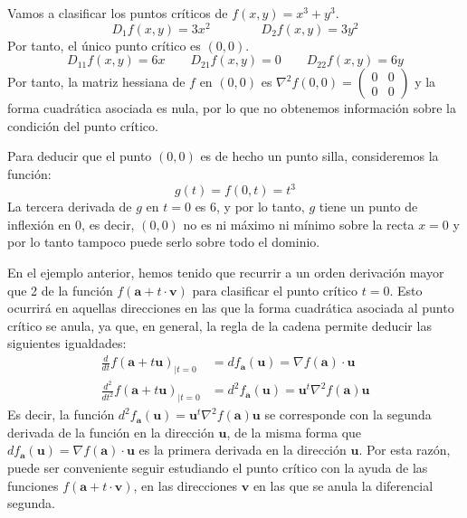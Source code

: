 \begin{ejemplo}
Vamos a clasificar los puntos críticos de $f(x,y)=x^3+y^3$.
\[
D_1f(x,y)=3x^2\qquad\qquad D_2f(x,y)=3y^2
\]
Por tanto, el único punto crítico es $(0,0)$.
\[
D_{11}f(x,y)=6x\qquad D_{21}f(x,y)=0\qquad D_{22}f(x,y)=6y
\]
Por tanto, la matriz hessiana de $f$ en $(0,0)$ es $\nabla^2f(0,0)=\left(\begin{array}{cc}0&0\\
0&0\end{array}\right)$ y la forma cuadrática asociada es nula, por lo que no obtenemos información sobre la condición del punto crítico.

Para deducir que el punto $(0,0)$ es de hecho un punto silla, consideremos la función:
\[
g(t)=f(0,t)=t^3
\]
La tercera derivada de $g$ en $t=0$ es $6$, y por lo tanto, $g$ tiene un punto de inflexión en $0$, es decir, $(0,0)$ no es ni máximo ni mínimo sobre la recta $x=0$ y por lo tanto tampoco puede serlo sobre todo el dominio.\fej
\end{ejemplo}

En el ejemplo anterior, hemos tenido que recurrir a un orden derivación mayor que 2 de la función
$f(\boldsymbol a+t\cdot\boldsymbol v)$ para clasificar el punto crítico $t=0$.
Esto ocurrirá en aquellas direcciones en las que la forma cuadrática asociada al punto crítico se anula, ya que, en general, la regla de la cadena permite deducir las siguientes igualdades:
\begin{align*}
\frac{d}{dt}f(\boldsymbol a+t\boldsymbol u)_{|t=0} & = df_{\boldsymbol a}(\boldsymbol u)=\nabla f(\boldsymbol a)\cdot\boldsymbol u \\
\frac{d^2}{dt^2}f(\boldsymbol a+t\boldsymbol u)_{|t=0} & = d^2f_{\boldsymbol a}(\boldsymbol u)= \boldsymbol u^t\nabla^2f(\boldsymbol a)\boldsymbol u
\end{align*}
Es decir, la función $d^2f_{\boldsymbol a}(\boldsymbol u) = \boldsymbol u^t\nabla^2f(\boldsymbol a)\boldsymbol u$ se corresponde con la segunda derivada de la función en la dirección $\boldsymbol u$, de la misma forma que $df_{\boldsymbol a}(\boldsymbol u)=\nabla f(\boldsymbol a)\cdot\boldsymbol u$ es la primera derivada en la dirección $\boldsymbol u$.
Por esta razón, puede ser conveniente seguir estudiando el punto crítico con la ayuda de las funciones $f(\boldsymbol a+t\cdot\boldsymbol v)$, en las direcciones $\boldsymbol v$ en las que se anula la diferencial segunda.

